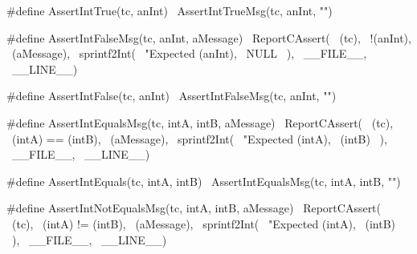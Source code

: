 {#define AssertIntTrue(tc, anInt) \
  AssertIntTrueMsg(tc, anInt, "")
\stopCHeader

\stopTestSuite

\startTestSuite[assertIntFalse]

\startCHeader
#define AssertIntFalseMsg(tc, anInt, aMessage) \
  ReportCAssert(                               \
    (tc),                                      \
    !(anInt),                                  \
    (aMessage),                                \
    sprintf2Int(                               \
      "Expected %
      (anInt),                                 \
      NULL                                     \
    ),                                         \
    __FILE__,                                  \
    __LINE__)

#define AssertIntFalse(tc, anInt) \
  AssertIntFalseMsg(tc, anInt, "")
\stopCHeader

\stopTestSuite

\startTestSuite[assertIntEquals]

\startCHeader
#define AssertIntEqualsMsg(tc, intA, intB, aMessage) \
  ReportCAssert(                                     \
    (tc),                                            \
    (intA) == (intB),                                \
    (aMessage),                                      \
    sprintf2Int(                                     \
      "Expected %
      (intA),                                        \
      (intB)                                         \
    ),                                               \
    __FILE__,                                        \
    __LINE__)

#define AssertIntEquals(tc, intA, intB) \
  AssertIntEqualsMsg(tc, intA, intB, "")
\stopCHeader

\stopTestSuite

\startTestSuite[assertIntNotEquals]

\startCHeader
#define AssertIntNotEqualsMsg(tc, intA, intB, aMessage) \
  ReportCAssert(                                        \
    (tc),                                               \
    (intA) != (intB),                                   \
    (aMessage),                                         \
    sprintf2Int(                                        \
      "Expected %
      (intA),                                           \
      (intB)                                            \
    ),                                                  \
    __FILE__,                                           \
    __LINE__)

}
